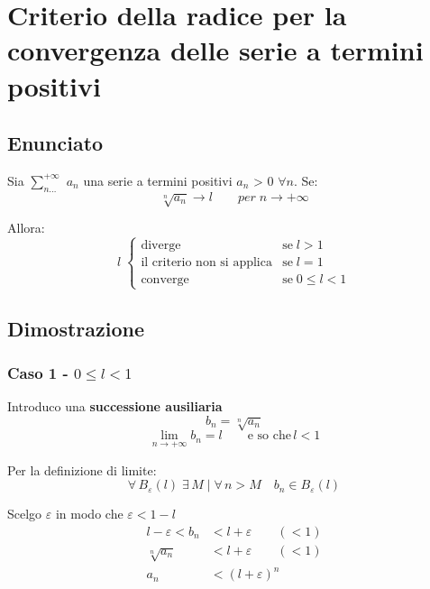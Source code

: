 \documentclass[../dimostrazioni]{subfiles}
\begin{document}
    \chapter{Criterio della radice per la convergenza delle serie a termini positivi}
    \label{criterioRadiceSerie}

        \section*{Enunciato}

            Sia \(\sum_{n\dots}^{+\infty}\) \(a_n\) una serie a termini positivi \(a_n\) > 0 \(\forall n\). Se:
             \[\sqrt[n]{a_n} \rightarrow l \qquad  per \; n  \rightarrow +\infty \]
            
            Allora:
            \[
                l \;
                \begin{cases}
                    \text{diverge} & \text{se} \; l > 1\\
                    \text{il criterio non si applica} & \text{se} \; l = 1\\
                    \text{converge} & \text{se} \; 0 \leqslant l < 1
                \end{cases}
            \]
            
        \section*{Dimostrazione}
            
            \subsection*{Caso 1 - \(0 \leqslant l < 1\)} 
                    
                Introduco una \textbf{successione ausiliaria}
                \[b_n = \sqrt[n]{a_n} \]  
                \[\lim_{n \to +\infty} b_n = l \qquad \text{e so che} \, l < 1\]

                Per la definizione di limite:
                \[\forall \, B_\varepsilon (l) \; \exists \, M \mid \forall \, n > M \quad b_n \in B_\varepsilon (l) \]

                Scelgo \(\varepsilon\) in modo che \(\varepsilon < 1 -l \)
                \begin{align*}
                    l - \varepsilon < b_n &< l + \varepsilon \qquad (<1) \\
                    \sqrt[n]{a_n} &< l + \varepsilon \qquad (<1) \\
                    a_n &< (l+\varepsilon)^{n}  
                \end{align*}
                                     
\end{document}
